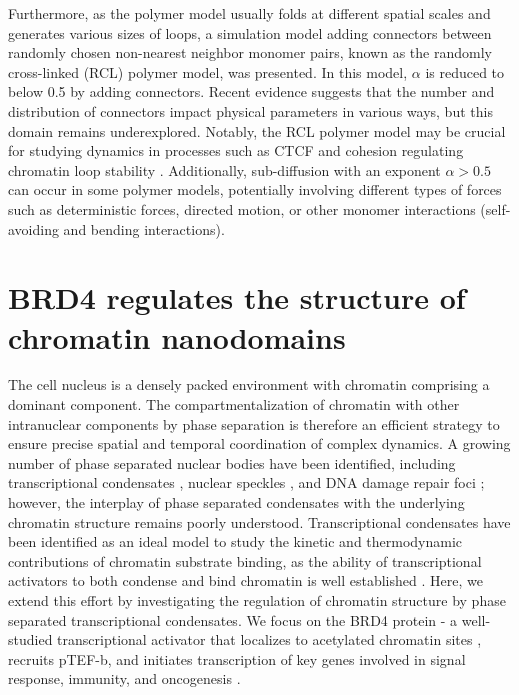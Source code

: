 Furthermore, as the polymer model usually folds at different spatial scales and generates various sizes of loops, a simulation model adding connectors between randomly chosen non-nearest neighbor monomer pairs, known as the randomly cross-linked (RCL) polymer model, was presented. In this model, $\alpha$ is reduced to below 0.5 by adding connectors. Recent evidence suggests that the number and distribution of connectors impact physical parameters in various ways, but this domain remains underexplored. Notably, the RCL polymer model may be crucial for studying dynamics in processes such as CTCF and cohesion regulating chromatin loop stability \parencite{Hansen2017}. Additionally, sub-diffusion with an exponent $\alpha > 0.5$ can occur in some polymer models, potentially involving different types of forces such as deterministic forces, directed motion, or other monomer interactions (self-avoiding and bending interactions).

\clearpage
\section{BRD4 regulates the structure of chromatin nanodomains}

The cell nucleus is a densely packed environment with chromatin comprising a dominant component. The compartmentalization of chromatin with other intranuclear components by phase separation is therefore an efficient strategy to ensure precise spatial and temporal coordination of complex dynamics. A growing number of phase separated nuclear bodies have been identified, including transcriptional condensates \parencite{Sabari2018,Hnisz2017}, nuclear speckles \parencite{Brown2008}, and DNA damage repair foci \parencite{Wang2023}; however, the interplay of phase separated condensates with the underlying chromatin structure remains poorly understood. Transcriptional condensates have been identified as an ideal model to study the kinetic and thermodynamic contributions of chromatin substrate binding, as the ability of transcriptional activators to both condense and bind chromatin is well established \parencite{Sabari2018,Wagh2021,Plys2018,Strom2024,Ma2021}. Here, we extend this effort by investigating the regulation of chromatin structure by phase separated transcriptional condensates. We focus on the BRD4 protein - a well-studied transcriptional activator that localizes to acetylated chromatin sites \parencite{Wu2018}, recruits pTEF-b, and initiates transcription of key genes involved in signal response, immunity, and oncogenesis \parencite{Itzen2014}.

